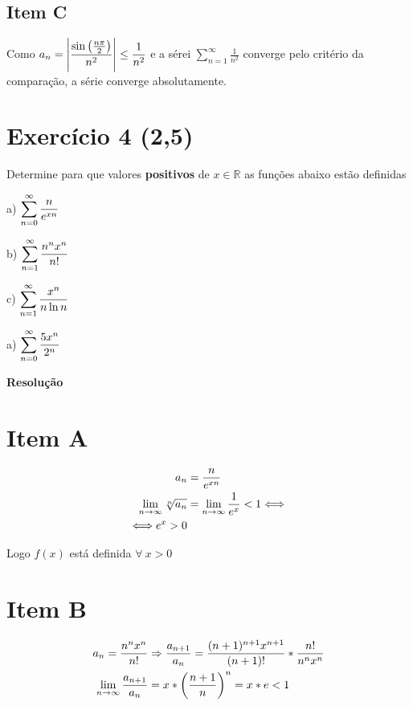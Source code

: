 \documentclass[12pt,openany]{book}
\newcommand{\LI}[1][n]{\lim_{{#1} \rightarrow \infty}}
\newcommand{\soma}[2][n]{\sum_{{#1} = #2}^\infty}
\newcommand{\E}[1]{Exercício #1}
\newcommand{\Resolve}{\begin{center} \textbf{Resolução} \end{center}}
\newcommand{\IT}[1]{Item {#1}}
\begin{document}
{{\begin{multicols}{3}
\subsection*{Item C}
Como $\displaystyle{a_n = \left|{\sin\left({n\pi \over 2}\right) \over n^2}\right| \leq {1 \over n^2}}$ e a sérei $\displaystyle{\soma{1} \frac{1}{n^2}}$  converge pelo critério da comparação, a série converge absolutamente.
\end{multicols}

\newpage

\section*{\E{4} (2,5)}{Determine para que valores \textbf{positivos} de $x \in \mathds{R}$ as funções abaixo estão definidas}

\begin{multicols}{4}
a) $\displaystyle{\soma{0} {n \over e^{xn}}}$

b) $\displaystyle{\soma{1} {n^n x^n \over n!}}$

c) $\displaystyle{\soma{1} {x^n \over n \ln{n}}}$

a) $\displaystyle{\soma{0} {5x^n \over 2^n}}$
\end{multicols}

\Resolve

\begin{multicols}{2}
\section*{\IT{A}}\begin{align*}
a_n &= {n \over e^{xn}} \\
\LI \sqrt[n]{a_n} &= \LI {1 \over e^x} < 1 \Longleftrightarrow\\
\Longleftrightarrow e^x > 0
\end{align*}

Logo $f(x)$ está definida $\forall \ x > 0$

\section*{\IT{B}}\begin{align*}
a_n = {n^n x^n \over n!} &\Rightarrow {a_{n+1} \over a_n} = {(n+1)^{n+1} x^{n+1} \over (n+1)!}*{n! \over n^n x^n}\\
\LI {a_{n+1} \over a_n} &= x*\left({n+1 \over n}\right)^n = x*e < 1
\end{align*}


\end{multicols}}}
\end{document}
